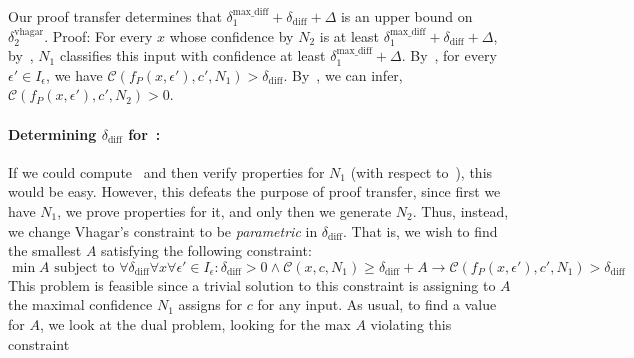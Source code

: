 \documentclass[11pt]{article}
\begin{document}
Our proof transfer determines that $\delta^\text{max\_diff}_1+\delta_\text{diff}+\Delta$ is an upper bound on $\delta^\text{vhagar}_2$. Proof: For every $x$ whose confidence by $N_2$ is at least  $\delta^\text{max\_diff}_1+\delta_\text{diff}+\Delta$, by~, $N_1$ classifies this input with confidence at least $\delta^\text{max\_diff}_1+\Delta$. By~, for every $\epsilon'\in I_\epsilon$, we have $\mathcal{C}(f_P(x,\epsilon'),c',N_1)>\delta_\text{diff}$. By~, we can infer, $\mathcal{C}(f_P(x,\epsilon'),c',N_2)>0$.

\paragraph{Determining $\delta_\text{diff}$ for~:}
If we could compute~ and then verify properties for $N_1$ (with respect to~), this would be easy. However, this defeats the purpose of proof transfer, since first we have $N_1$, we prove properties for it, and only then we generate $N_2$. 
Thus, instead, %
we change Vhagar's constraint to be \emph{parametric} in $\delta_\text{diff}$. That is, we wish to find the smallest $A$ satisfying the following constraint:
\begin{equation}\label{eq:func}
\min A\text { subject to }\forall \delta_\text{diff} \forall{x}\forall{\epsilon'}\in{I_\epsilon}:    \delta_\text{diff}>0\land \mathcal{C}(x,c,N_1) \geq \delta_\text{diff} + A\rightarrow \mathcal{C}(f_P(x,\epsilon'),c',N_1)>\delta_\text{diff}
\end{equation}
This problem is feasible since a trivial solution to this constraint is assigning to $A$ the maximal confidence $N_1$ assigns for $c$ for any input. %
As usual, to find a value for $A$, we look at the dual problem, looking for the max $A$ violating this constraint
\end{document}
